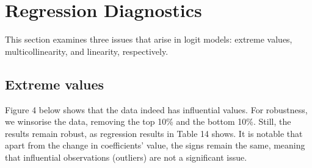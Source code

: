 \documentclass[a4paper,nobind]{templates/ociamthesis}
\begin{document}
\newpage

\hypertarget{regression-diagnostics}{%
\section{Regression Diagnostics}\label{regression-diagnostics}}

This section examines three issues that arise in logit models: extreme values, multicollinearity, and linearity, respectively.

\hypertarget{extreme-values}{%
\subsection{Extreme values}\label{extreme-values}}

Figure 4 below shows that the data indeed has influential values. For robustness, we winsorise the data, removing the top 10\% and the bottom 10\%. Still, the results remain robust, as regression results in Table 14 shows. It is notable that apart from the change in coefficients' value, the signs remain the same, meaning that influential observations (outliers) are not a significant issue.
\end{document}
